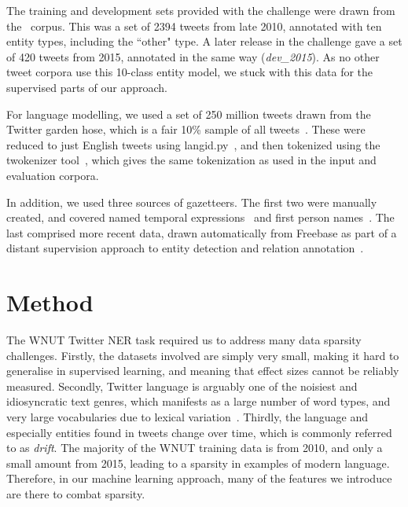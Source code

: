 \documentclass[11pt|a4paper]{article}
\begin{document}
The training and development sets provided with the challenge were drawn from the~ corpus.
This was a set of 2394 tweets from late 2010, annotated with ten entity types, including the ``other" type.
A later release in the challenge gave a set of 420 tweets from 2015, annotated in the same way ({\em dev\_2015}).
As no other tweet corpora use this 10-class entity model, we stuck with this data for the supervised parts of our approach.

For language modelling, we used a set of 250 million tweets drawn from the Twitter garden hose, which is a fair 10\% sample of all tweets~\cite{kergl}.
These were reduced to just English tweets using langid.py~\cite{lui2012langid}, and then tokenized using the twokenizer tool~\cite{Connor_Krieger_Ahn_2010}, which gives the same tokenization as used in the input and evaluation corpora.

In addition, we used three sources of gazetteers.
The first two were manually created, and covered named temporal expressions~\cite{brucato2013recognising} and first person names~\cite{Cun02b-short}.
The last comprised more recent data, drawn automatically from Freebase as part of a distant supervision approach to entity detection and relation annotation~\cite{augenstein2014relation}.

\section{Method}
The WNUT Twitter NER task required us to address many data sparsity challenges.
Firstly, the datasets involved are simply very small, making it hard to generalise in supervised learning, and meaning that effect sizes cannot be reliably measured.
Secondly, Twitter language is arguably one of the noisiest and idiosyncratic text genres, which manifests as a large number of word types, and very large vocabularies due to lexical variation~\cite{Eisenstein2013}.
Thirdly, the language and especially entities found in tweets change over time, which is commonly referred to as {\em drift}.
The majority of the WNUT training data is from 2010, and only a small amount from 2015, leading to a sparsity in examples of modern language.
Therefore, in our machine learning approach, many of the features we introduce are there to combat sparsity.
\end{document}
